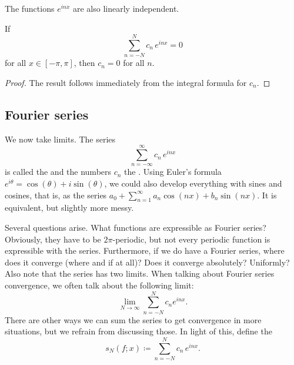 The functions $e^{inx}$ are also linearly independent.

\begin{prop}
If
\begin{equation*}
\sum_{n=-N}^N c_n \, e^{inx} = 0
\end{equation*}
for all $x \in [-\pi,\pi]$, then $c_n = 0$ for all $n$.
\end{prop}

\begin{proof}
The result follows immediately from the integral formula for $c_n$.
\end{proof}

\subsection{Fourier series}

We now take limits.  The series
\begin{equation*}
\sum_{n=-\infty}^\infty c_n \, e^{inx}
\end{equation*}
is called
the \emph{} and the numbers $c_n$
the \emph{}.  Using
Euler's formula $e^{i\theta} = \cos(\theta) + i \sin (\theta)$,
we could also develop everything with
sines and cosines, that is, as the series
$a_0 + \sum_{n=1}^\infty a_n \cos(nx) + b_n \sin(nx)$.
It is equivalent, but slightly more messy.

Several questions arise.  What functions are expressible as 
Fourier series?  Obviously, they have to be $2\pi$-periodic, but not every
periodic function is expressible with the series.  Furthermore, if we do have
a Fourier series, where does it converge (where and if at all)?  Does it converge
absolutely?  Uniformly?  Also note that the series has two
limits.  When talking about Fourier series convergence, we often
talk about the following limit:
\begin{equation*}
\lim_{N\to\infty} 
\sum_{n=-N}^N c_n e^{inx} .
\end{equation*}
There are other ways we can sum the series to get convergence in more
situations, but we refrain from discussing those.  In light of this,
define the \emph{}
\begin{equation*}
s_N(f;x) \coloneqq 
\sum_{n=-N}^N c_n \,e^{inx} .
\end{equation*}

\medskip

